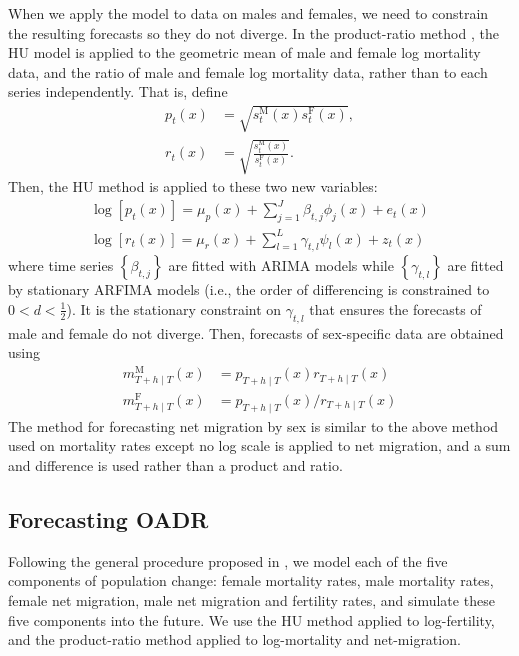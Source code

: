 \documentclass[11pt,a4paper,]{article}
\begin{document}
When we apply the \textcite{HU07} model to data on males and females, we need to constrain the resulting forecasts so they do not diverge. In the product-ratio method \autocite{HBY13}, the HU model is applied to the geometric mean of male and female log mortality data, and the ratio of male and female log mortality data, rather than to each series independently. That is, define
\begin{align}
  p_t(x)&=\sqrt{s_{t}^{\text{M}}(x)s_{t}^{\text{F}}(x)}, \label{eq:coherent_1}\\
  r_t(x)&=\sqrt{\frac{s_{t}^{\text{M}}(x)}{s_{t}^{\text{F}}(x)}}. \label{eq:coherent_2}
\end{align}
Then, the HU method is applied to these two new variables:
\begin{align*}
  \log[p_t(x)]=\mu_p(x)+\sum_{j=1}^{J}\beta_{t,j}\phi_j(x)+e_t(x)\\
  \log[r_t(x)]=\mu_r(x)+\sum_{l=1}^{L}\gamma_{t,l}\psi_l(x)+z_t(x)
\end{align*}
where time series \(\left\{\beta_{t,j}\right\}\) are fitted with ARIMA models while \(\left\{\gamma_{t,l}\right\}\) are fitted by stationary ARFIMA models (i.e., the order of differencing is constrained to \(0<d<\frac{1}{2}\)). It is the stationary constraint on \(\gamma_{t,l}\) that ensures the forecasts of male and female do not diverge. Then, forecasts of sex-specific data are obtained using
\begin{align*}
  m_{T+h\mid T}^{\text{M}}(x) & = p_{T+h\mid T}(x)r_{T+h\mid T}(x)\\
  m_{T+h\mid T}^{\text{F}}(x) & = p_{T+h\mid T}(x)/r_{T+h\mid T}(x)
\end{align*}
The method for forecasting net migration by sex is similar to the above method used on mortality rates except no log scale is applied to net migration, and a sum and difference is used rather than a product and ratio.

\hypertarget{forecasting-oadr}{%
\subsection{Forecasting OADR}\label{forecasting-oadr}}

Following the general procedure proposed in \textcite{HB08}, we model each of the five components of population change: female mortality rates, male mortality rates, female net migration, male net migration and fertility rates, and simulate these five components into the future. We use the HU method applied to log-fertility, and the product-ratio method applied to log-mortality and net-migration.
\end{document}
